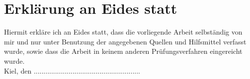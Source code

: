 \null
\vfill
\section*{Erklärung an Eides statt}
Hiermit erkläre ich an Eides statt, dass die vorliegende Arbeit selbständig von mir und nur unter Benutzung der angegebenen Quellen und Hilfsmittel verfasst wurde, sowie dass die Arbeit in keinem anderen Prüfungsverfahren eingereicht wurde.\\

Kiel, den ....................\quad\quad\quad...................................